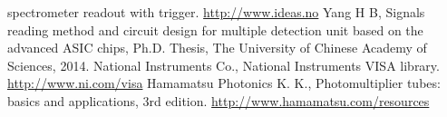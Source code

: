\documentclass{nst}
\providecommand{\DIFadd}[1]{{\protect\color{yellow} #1}} %
\providecommand{\DIFaddbegin}{} %
\providecommand{\DIFaddend}{} %
\providecommand{\DIFdelbegin}{} %
\providecommand{\DIFdelend}{} %
\begin{document}
\begin{thebibliography}{99}
\DIFdelend \DIFaddbegin \DIFadd{spectrometer readout with trigger. }\href{http://www.ideas.no/products/ide3160-2/}{http://www.ideas.no}
	\DIFaddend {} Yang \DIFdelbegin \DIFdelend \DIFaddbegin \DIFadd{H B, Signals reading method and circuit design for multiple detection unit based on the advanced }\DIFaddend {ASIC} \DIFdelbegin \DIFdelend \DIFaddbegin \DIFadd{chips, }\DIFaddend Ph.D. Thesis, The University of Chinese Academy of Sciences, 2014.
	\DIFaddbegin {} \DIFadd{National Instruments Co.,  National Instruments }{\DIFadd{VISA}} \DIFadd{library. }\href{http://www.ni.com/visa/}{http://www.ni.com/visa}
	\DIFaddend {} Hamamatsu Photonics K. K., Photomultiplier tubes: basics and applications, 3rd \DIFdelbegin %
\DIFdelend \DIFaddbegin \DIFadd{edition.
	}\href{http://www.hamamatsu.com/resources/pdf/etd/PMT_handbook_v3aE.pdf}{http://www.hamamatsu.com/resources}
\DIFaddend \end{thebibliography}


%
\end{document}
